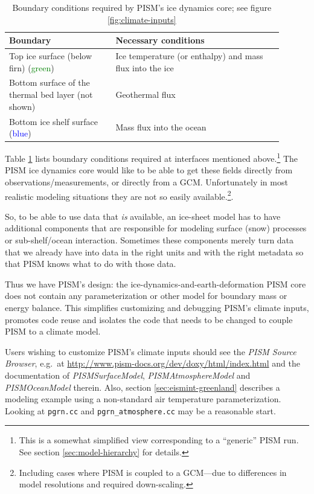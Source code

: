 \documentclass[11pt,final]{amsart}
\begin{document}
\begin{table}[h]
  \centering
  \begin{tabular}{p{0.35\linewidth}p{0.55\linewidth}}\\
    \hline
    \textbf{Boundary} & \textbf{Necessary conditions}\\
    \hline
    Top ice surface (below firn) (\textcolor{green}{green})& Ice temperature (or enthalpy) and mass flux into the ice\\
    Bottom surface of the thermal bed layer (not shown) & Geothermal flux\\
    Bottom ice shelf surface (\textcolor{blue}{blue})& Mass flux into the ocean\\
   \hline
  \end{tabular}
  \caption{Boundary conditions required by PISM's ice dynamics core; see figure
  \ref{fig:climate-inputs}}
  \label{tab:ice-dynamics-bc}
\end{table}

Table \ref{tab:ice-dynamics-bc} lists boundary conditions required at
interfaces mentioned above.\footnote{This is a somewhat simplified view  corresponding to a ``generic'' PISM run.   See section \ref{sec:model-hierarchy} for details.}  The PISM ice dynamics core would like to be able to get these fields directly from observations/measurements, or directly from a GCM.  Unfortunately in most realistic modeling situations they are not so easily available.\footnote{Including cases where PISM is coupled to a GCM---due to differences in model resolutions and required down-scaling.}.

So, to be able to use data that \emph{is} available, an ice-sheet model has to
have additional components that are responsible for modeling surface (snow)
processes or sub-shelf/ocean interaction.  Sometimes these components merely turn data that we already have into data in the right units and with the right metadata so that PISM knows what to do with those data.

Thus we have PISM's design: the ice-dynamics-and-earth-deformation PISM
core does not contain any parameterization or other model for boundary mass or
energy balance.  This simplifies customizing and debugging PISM's climate
inputs, promotes code reuse and isolates the code that needs to be changed to
couple PISM to a climate model.

Users wishing to customize PISM's climate inputs should see the \emph{PISM
  Source Browser}, e.g.~at
\url{http://www.pism-docs.org/dev/doxy/html/index.html} and the documentation
of \emph{PISMSurfaceModel}, \emph{PISMAtmosphereModel} and
\emph{PISMOceanModel} therein.  Also, section \ref{sec:eismint-greenland} describes a
modeling example using a non-standard air temperature parameterization. Looking
at \texttt{pgrn.cc} and \texttt{pgrn\_atmosphere.cc} may be a reasonable
start.
\end{document}
